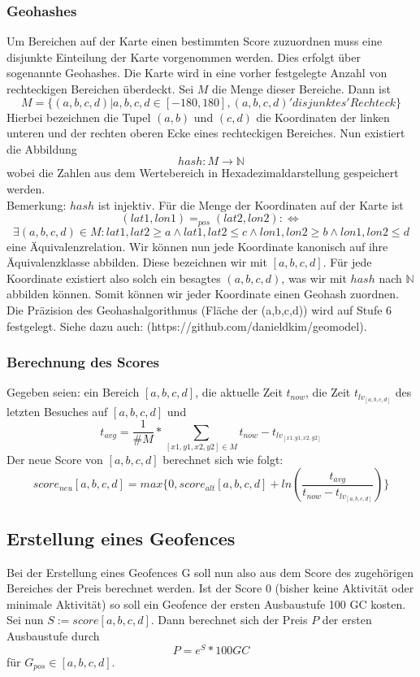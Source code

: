 \documentclass{scrreprt}
\begin{document}
\subsubsection{Geohashes}
Um Bereichen auf der Karte einen bestimmten Score zuzuordnen muss eine disjunkte Einteilung der Karte vorgenommen werden. Dies erfolgt über sogenannte Geohashes. Die Karte wird in eine vorher festgelegte Anzahl von rechteckigen Bereichen überdeckt. Sei $M$ die Menge dieser Bereiche. Dann ist \[ M = \{(a,b,c,d) | a,b,c,d \in [-180,180], (a,b,c,d)  'disjunktes' Rechteck\} \] Hierbei bezeichnen die Tupel $(a,b)$ und $(c,d)$ die Koordinaten der linken unteren und der rechten oberen Ecke eines rechteckigen Bereiches. Nun existiert die Abbildung \[ hash: M \rightarrow \mathbb{N}\] wobei die Zahlen aus dem Wertebereich in Hexadezimaldarstellung gespeichert werden.\\ Bemerkung: $hash$ ist injektiv. Für die Menge der Koordinaten auf der Karte ist \[(lat1,lon1) =_{pos} (lat2,lon2) :\Leftrightarrow\] \[ \exists (a,b,c,d) \in M: lat1, lat2 \ge a \land lat1,lat2 \le c \land  lon1, lon2 \ge b \land lon1,lon2 \le d\] eine Äquivalenzrelation.
Wir können nun jede Koordinate kanonisch auf ihre Äquivalenzklasse abbilden. Diese bezeichnen wir mit $[a,b,c,d]$. Für jede Koordinate existiert also solch ein besagtes $(a,b,c,d)$, was wir mit $hash$ nach $\mathbb{N}$ abbilden können. Somit können wir jeder Koordinate einen Geohash zuordnen. 
Die Präzision des Geohashalgorithmus (Fläche der (a,b,c,d)) wird auf Stufe 6 festgelegt. Siehe dazu auch: (https://github.com/danieldkim/geomodel). 
\subsubsection{Berechnung des Scores}
Gegeben seien: ein Bereich $[a,b,c,d]$, die aktuelle Zeit $t_{now}$, die Zeit $t_{lv_{ [a,b,c,d]}}$ des letzten Besuches auf $[a,b,c,d]$ und  \[t_{avg} = \frac{1}{\#M} * \sum_{[x1,y1,x2,y2] \in M} t_{now} - t_{lv_{ [x1,y1,x2,y2]}}\] Der neue Score von $[a,b,c,d]$ berechnet sich wie folgt:
\[score_{neu}[a,b,c,d] = max\{0, score_{alt}[a,b,c,d] + ln(\frac{t_{avg}}{t_{now}-t_{lv_{ [a,b,c,d]}}})\}\]
\subsection{Erstellung eines Geofences}
Bei der Erstellung eines Geofences G soll nun also aus dem Score des zugehörigen Bereiches der Preis berechnet werden. Ist der Score 0 (bisher keine Aktivität oder minimale Aktivität) so soll ein Geofence der ersten Ausbaustufe 100 GC kosten. Sei nun $S := score [a,b,c,d]$. Dann berechnet sich der Preis $P$ der ersten Ausbaustufe durch \[P = e^S * 100 GC\] für $G_{pos} \in [a,b,c,d]$.
 
\end{document}
